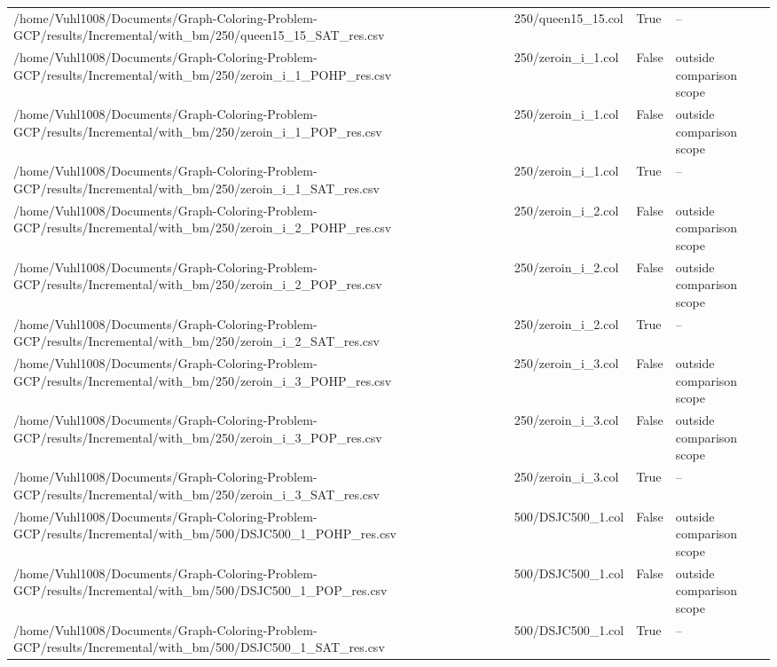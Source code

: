 \begin{table}[htbp]
\begin{tabular}{llll}
/home/Vuhl1008/Documents/Graph-Coloring-Problem-GCP/results/Incremental/with\_bm/250/queen15\_15\_SAT\_res.csv & 250/queen15\_15.col & True & -- \\
/home/Vuhl1008/Documents/Graph-Coloring-Problem-GCP/results/Incremental/with\_bm/250/zeroin\_i\_1\_POHP\_res.csv & 250/zeroin\_i\_1.col & False & outside comparison scope \\
/home/Vuhl1008/Documents/Graph-Coloring-Problem-GCP/results/Incremental/with\_bm/250/zeroin\_i\_1\_POP\_res.csv & 250/zeroin\_i\_1.col & False & outside comparison scope \\
/home/Vuhl1008/Documents/Graph-Coloring-Problem-GCP/results/Incremental/with\_bm/250/zeroin\_i\_1\_SAT\_res.csv & 250/zeroin\_i\_1.col & True & -- \\
/home/Vuhl1008/Documents/Graph-Coloring-Problem-GCP/results/Incremental/with\_bm/250/zeroin\_i\_2\_POHP\_res.csv & 250/zeroin\_i\_2.col & False & outside comparison scope \\
/home/Vuhl1008/Documents/Graph-Coloring-Problem-GCP/results/Incremental/with\_bm/250/zeroin\_i\_2\_POP\_res.csv & 250/zeroin\_i\_2.col & False & outside comparison scope \\
/home/Vuhl1008/Documents/Graph-Coloring-Problem-GCP/results/Incremental/with\_bm/250/zeroin\_i\_2\_SAT\_res.csv & 250/zeroin\_i\_2.col & True & -- \\
/home/Vuhl1008/Documents/Graph-Coloring-Problem-GCP/results/Incremental/with\_bm/250/zeroin\_i\_3\_POHP\_res.csv & 250/zeroin\_i\_3.col & False & outside comparison scope \\
/home/Vuhl1008/Documents/Graph-Coloring-Problem-GCP/results/Incremental/with\_bm/250/zeroin\_i\_3\_POP\_res.csv & 250/zeroin\_i\_3.col & False & outside comparison scope \\
/home/Vuhl1008/Documents/Graph-Coloring-Problem-GCP/results/Incremental/with\_bm/250/zeroin\_i\_3\_SAT\_res.csv & 250/zeroin\_i\_3.col & True & -- \\
/home/Vuhl1008/Documents/Graph-Coloring-Problem-GCP/results/Incremental/with\_bm/500/DSJC500\_1\_POHP\_res.csv & 500/DSJC500\_1.col & False & outside comparison scope \\
/home/Vuhl1008/Documents/Graph-Coloring-Problem-GCP/results/Incremental/with\_bm/500/DSJC500\_1\_POP\_res.csv & 500/DSJC500\_1.col & False & outside comparison scope \\
/home/Vuhl1008/Documents/Graph-Coloring-Problem-GCP/results/Incremental/with\_bm/500/DSJC500\_1\_SAT\_res.csv & 500/DSJC500\_1.col & True & -- \\

\end{tabular}
\end{table}
